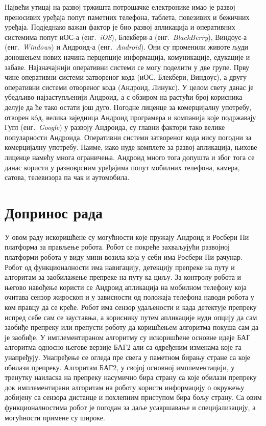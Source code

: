 \documentclass[12pt,oneside]{memoir}
\theoremstyle{remark}
\begin{document}
Највећи утицај на развој тржишта потрошачке електронике имао је развој преносивих уређаја попут паметних телефона, таблета, повезивих и бежичних уређаја. Подједнако важан фактор је био развој апликација и оперативних системима попут иОС-а (енг.~{\em iOS}), Блекбери-а (енг.~{\em BlackBerry}), Виндоус-а (енг.~{\em Windows}) и Андроид-а (енг.~{\em Android}). Они су променили животе људи доношењем нових начина перцепције информација, комуникације, едукације и забаве. Најзначајнији оперативни системи се могу поделити у две групе. Прву чине оперативни системи затвореног кода (иОС, Блекбери, Виндоус), а другу оперативни системи отвореног кода (Андроид, Линукс). У целом свету данас је убедљиво најзаступљенији Андроид, а с обзиром на растући број корисника делује да ће тако остати још дуго. Погодне лиценце за комерцијалну употребу, отворен к\^{o}д, велика заједница Андроид програмера и компанија које подржавају Гугл (енг.~{\em Google}) у развоју Андроида, су главни фактори тако велике популарности Андроида. Оперативни системи затвореног кода нису погодни за комерцијалну употребу. Наиме, иако нуде комплете за развој апликација, њихове лиценце намећу многа ограничења. Андроид много тога допушта  и због тога се данас користи у разноврсним уређајима попут мобилних телефона, камера, сатова, телевизора па чак и аутомобила.

\section{Допринос рада}
У овом раду искоришћене су могућности које пружају Андроид и Росбери Пи платформа за прављење робота. Робот се покреће захваљујући развојној платформи робота у виду мини-возила која у себи има Росбери Пи рачунар. Робот од функционалности има навигацију, детекцију препреке на путу и алгоритам за заобилажење препреке на путу ка циљу. За контролу робота и његово навођење користи се Андроид апликација на мобилном телефону која очитава сензор жироскоп и у зависности од положаја телефона наводи робота у ком правцу да се креће. Робот има сензор удаљености и када детектује препреку испред себе сам се зауставња, а кориснику путем апликације нуди опцију да сам заобиђе препреку или препусти роботу да коришћењем алгоритма покуша сам да је заобиђе. У имплементираном алгоритму су искоришћене основне идеје БАГ алгоритма односно његове верзије БАГ2 али са одређеним изменама које га унапређују. Унапређење се огледа пре свега у паметном бирању стране са које обилази препреку. Алгоритам БАГ2, у својој основној имплементацији, у тренутку наиласка на препреку насумично бира страну са које обилази препреку док имплементирани алгоритам на роботу користи информацију о окружењу добијену са сензора дистанце и похлепним приступом бира бољу страну. Са овим функционалностима робот је погодан за даље усавршавање и специјализацију, а могућности примене су широке. 
\end{document}
